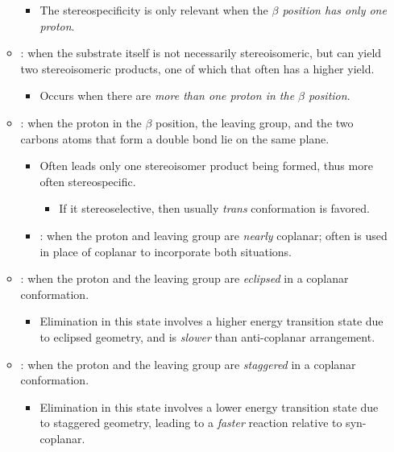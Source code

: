 \begin{itemize}
\begin{itemize}
            \begin{itemize}
                \item The stereospecificity is only relevant when the \emph{\(\beta \) position has only one proton}.
            \end{itemize}
        \item {}: when the substrate itself is not necessarily stereoisomeric, but can yield two stereoisomeric products, one of which that often has a higher yield.
            \begin{itemize}
                \item Occurs when there are \emph{more than one proton in the \(\beta \) position}.
            \end{itemize}
        \item {}: when the proton in the \(\beta \) position, the leaving group, and the two carbons atoms that form a double bond lie on the same plane.
            \begin{itemize}
                \item Often leads only one stereoisomer product being formed, thus more often stereospecific.
                    \begin{itemize}
                        \item If it stereoselective, then usually \textit{trans} conformation is favored.
                    \end{itemize}
                \item {}: when the proton and leaving group are \emph{nearly} coplanar; often is used in place of coplanar to incorporate both situations.
            \end{itemize}
        \item {}: when the proton and the leaving group are \emph{ eclipsed} in a coplanar conformation.
            \begin{itemize}
                \item Elimination in this state involves a higher energy transition state due to eclipsed geometry, and is \emph{slower} than anti-coplanar arrangement.
            \end{itemize}
        \item {}: when the proton and the leaving group are \emph{staggered} in a coplanar conformation.
            \begin{itemize}
                \item Elimination in this state involves a lower energy transition state due to staggered geometry, leading to a \emph{faster} reaction relative to syn-coplanar.
            \end{itemize}
    \end{itemize}
\end{itemize}


